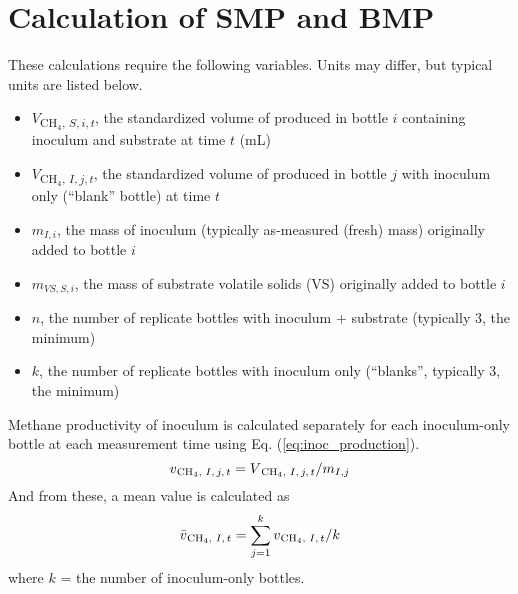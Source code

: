\documentclass[]{article}
\begin{document}
\section{Calculation of SMP and BMP}
These calculations require the following variables.
Units may differ, but typical units are listed below.
\begin{itemize}
  \item $V$\textsubscript{{CH$_4$, $S, i, t$}}, the standardized volume of  produced in bottle $i$ containing inoculum and substrate at time $t$ (mL)
  \item $V$\textsubscript{{CH$_4$, $I, j, t$}}, the standardized volume of  produced in bottle $j$ with inoculum only (``blank'' bottle) at time $t$
  \item $m_{I, i}$, the mass of inoculum (typically as-measured (fresh) mass) originally added to bottle $i$
  \item $m_{VS, S, i}$, the mass of substrate volatile solids (VS) originally added to bottle $i$
  \item $n$, the number of replicate bottles with inoculum + substrate (typically 3, the minimum)
  \item $k$, the number of replicate bottles with inoculum only (``blanks'', typically 3, the minimum)
\end{itemize}

Methane productivity of inoculum is calculated separately for each inoculum-only bottle at each measurement time using Eq. (\ref{eq:inoc_production}).
\begin{equation}
  \label{eq:inoc_production}
  v\textsubscript{{CH$_4$, $I, j, t$}} = V\textsubscript{{CH$_4$, $I, j, t$}} / m_{I, j} 
\end{equation}
And from these, a mean value is calculated as 
\begin{equation}
  \label{eq:inoc_productivity}
  \bar{v}\textsubscript{{CH$_4$, $I, t$}} = \sum_{j = 1} ^k v\textsubscript{{CH$_4$, $I, t$}} / k
\end{equation}
where $k$ = the number of inoculum-only bottles.
\end{document}
